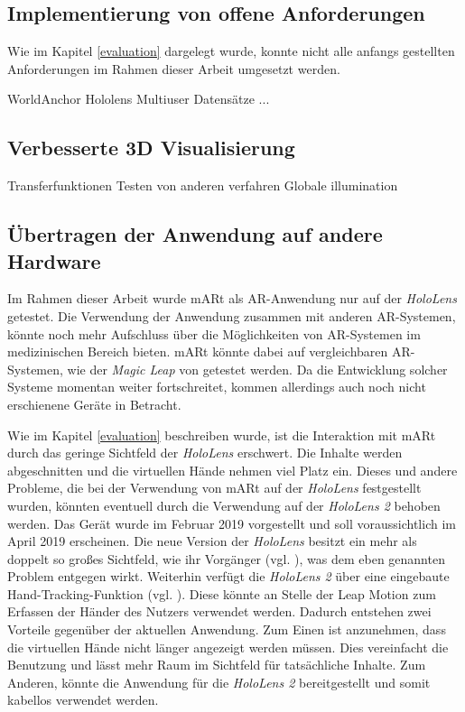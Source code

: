 \subsection{Implementierung von offene  Anforderungen}

Wie im Kapitel \ref{evaluation} dargelegt wurde, konnte nicht alle anfangs gestellten Anforderungen im Rahmen dieser Arbeit umgesetzt werden. 

WorldAnchor Hololens
Multiuser
Datensätze
...

\subsection{Verbesserte 3D Visualisierung}
Transferfunktionen
Testen von anderen verfahren
Globale illumination

\subsection{Übertragen der Anwendung auf andere Hardware}
\label{hololens2Fazit}

Im Rahmen dieser Arbeit wurde mARt als AR-Anwendung nur auf der \textit{HoloLens} getestet. 
Die Verwendung der Anwendung zusammen mit anderen AR-Systemen, könnte noch mehr Aufschluss über die Möglichkeiten von AR-Systemen im medizinischen Bereich bieten. 
mARt könnte dabei auf vergleichbaren AR-Systemen, wie der \textit{Magic Leap} von \cite{magicLeap} getestet werden.
Da die Entwicklung solcher Systeme momentan weiter fortschreitet, kommen allerdings auch noch nicht erschienene Geräte in Betracht.

Wie im Kapitel \ref{evaluation} beschreiben wurde, ist die Interaktion mit mARt durch das geringe Sichtfeld der \textit{HoloLens} erschwert. Die Inhalte werden abgeschnitten und die virtuellen Hände nehmen viel Platz ein. 
Dieses und andere Probleme, die bei der Verwendung von mARt auf der \textit{HoloLens} festgestellt wurden, könnten eventuell durch die Verwendung auf der \textit{HoloLens 2} behoben werden. 
Das Gerät wurde im Februar 2019 vorgestellt und soll voraussichtlich im April 2019 erscheinen. 
Die neue Version der \textit{HoloLens} besitzt ein mehr als doppelt so großes Sichtfeld, wie ihr Vorgänger (vgl. \cite{hololens2}), was dem eben genannten Problem entgegen wirkt. 
Weiterhin verfügt die \textit{HoloLens 2} über eine eingebaute Hand-Tracking-Funktion (vgl. \cite{hololens2}). Diese könnte an Stelle der Leap Motion zum Erfassen der Händer des Nutzers verwendet werden. Dadurch entstehen zwei Vorteile gegenüber der aktuellen Anwendung. Zum Einen ist anzunehmen, dass die virtuellen Hände nicht länger angezeigt werden müssen. Dies vereinfacht die Benutzung und lässt mehr Raum im Sichtfeld für tatsächliche Inhalte. Zum Anderen, könnte die Anwendung für die \textit{HoloLens 2} bereitgestellt und somit kabellos verwendet werden. 

